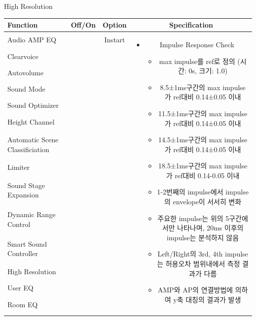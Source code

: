 \documentclass{beamer}
\begin{document}
	\begin{frame}[t]{High Resolution}
		\begin{tiny}
			\begin{tabular}{@{}lccc@{}}
				\toprule
				Function & Off/On & Option & Specification \\
				\midrule
				Audio AMP EQ & \color{black}{Off} & Instart &
				\multirow{14}{60mm}{
					\begin{itemize}
						\item Impulse Response Check
						\begin{itemize}
							\item max impulse를 ref로 정의 (시간: 0s, 크기: 1.0)
							\item 8.5±1ms구간의 max impulse가 ref대비 0.14±0.05 이내
							\item 11.5±1ms구간의 max impulse가 ref대비 0.14±0.05 이내
							\item 14.5±1ms구간의 max impulse가 ref대비 0.14±0.05 이내
							\item 18.5±1ms구간의 max impulse가 ref대비 0.14-0.05 이내
							\item 1-2번째의 impulse에서 impulse의 envelope이 서서히 변화
							\item 주요한 impulse는 위의 5구간에서만 나타나며, 20ms 이후의 impulse는 분석하지 않음
							\item Left/Right의 3rd, 4th impulse는 허용오차 범위내에서 측정 결과가 다름
							\item AMP와 AP의 연결방법에 의하여 y축 대칭의 결과가 발생
						\end{itemize}
					\end{itemize}
				} \\
				Clearvoice & \color{black}{Off} & & \\
				Autovolume & \color{black}{Off} & & \\
				Sound Mode & \color{black}{Off} & & \\
				Sound Optimizer & \color{black}{Off} & & \\
				Height Channel & \color{black}{Off} & & \\
				Automatic Scene Classificiation & \color{black}{Off} & & \\
				Limiter & \color{black}{Off} & & \\
				Sound Stage Expansion & \color{black}{Off} & & \\
				Dynamic Range Control & \color{black}{Off} & & \\
				Smart Sound Controller & \color{black}{Off} & & \\
				High Resolution & \color{blue}{On} & & \\
				User EQ & \color{black}{Off} & & \\
				Room EQ & \color{black}{Off} & & \\
				\color{blue}{OSD Volume} & \color{blue}{On} &  \color{blue}{Vol.40} & \\
				\midrule
			\end{tabular}
		\end{tiny}
		

\end{frame}
\end{document}
